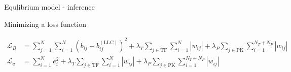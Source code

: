 \begin{frame}{Equlibrium model - inference}
\label{sec:equilibrium_inference}


Minimizing a loss function


\begin{subequations}
\label{eq:loss}
\begin{align}
\mathcal{L}_B &=
\sum_{j=1}^N \sum_{i=1}^N
\left(b_{ij} - b_{ij}^{(\text{LLC})}\right)^2
+ \lambda_T \sum_{j \in \text{TF}} \sum_{i=1}^N |w_{ij}| + \lambda_P \sum_{j \in \text{PK}} \sum_{i=1}^{N_T + N_P} |w_{ij}|
\label{eq:loss_B}
\\
\mathcal{L}_{\boldsymbol{e}} &=
\sum_{i=1}^N e_i^2 + \lambda_T \sum_{j \in \text{TF}} \sum_{i=1}^N |w_{ij}| + \lambda_P \sum_{j \in \text{PK}} \sum_{i=1}^{N_T + N_P} |w_{ij}|
\label{eq:loss_e}
\end{align}
\end{subequations}



\end{frame}